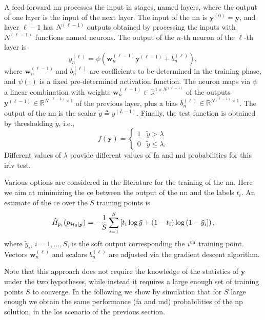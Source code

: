 \documentclass[conference]{IEEEtran}
\newcommand{\hatcross}{\hat{H}_{p_t}(p_{\mathcal{H}_0|\bf y})}
\begin{document}
A feed-forward \ac{nn} processes the input in stages, named layers, where the output of one layer is the input of the next layer. The input of the \ac{nn} is $\bm{y}^{(0)} = \bm{y}$, and layer $\ell-1$ has $N^{(\ell-1)}$ outputs obtained by processing the inputs with $N^{(\ell-1)}$ functions named neurons. The output of the $n$-th neuron of the $\ell$-th layer is
\begin{equation}\label{eq:nonLin}
y_n^{(\ell)} = \psi\left( \bm{w}_n^{(\ell -1)}\bm{y}^{(\ell-1)}+b_n^{(\ell)} \right),
\end{equation}
where $\bm{w}_n^{(\ell -1)}$ and $b_n^{(\ell)}$ are coefficients to be determined in the training phase, and $\psi(\cdot)$ is a fixed pre-determined activation function. The neuron maps via  $\psi$ a  linear combination with weights $\bm{w}_n^{(\ell -1)}\in \mathbb{R}^{1\times N^{(\ell-1)}}$ of the outputs $\bm{y}^{(\ell-1)} \in \mathbb{R}^{N^{(\ell-1)} \times 1 }$ of the previous layer, plus a bias $b_n^{(\ell)} \in \mathbb{R}^{N^{(\ell-1)} \times 1 }$. The output of the \ac{nn} is the scalar $\tilde{y} \triangleq y^{(L-1)}$. Finally, the test function is obtained by thresholding $\tilde{y}$, i.e.,
\begin{equation}
    f(\bm{y}) = \begin{cases}
    1 & \tilde{y} > \lambda \\
    0 & \tilde{y} \leq \lambda.
    \end{cases}
\end{equation}
Different values of $\lambda$ provide different values of \ac{fa} and \ac{md} probabilities for this \ac{irlv} test.

Various options are considered in the literature for the training of the \ac{nn}. Here we aim at minimizing the \ac{ce} between the output of the \ac{nn} and the labels $t_i$. An estimate of the \ac{ce} over the $S$ training points is 
\begin{equation}\label{eq:ce}
\hatcross = -\frac{1}{S} \sum_{i=1}^{S}\left[t_i\log \tilde{y} +\left(1-t_i\right)\log\left(1-\tilde{y}_i\right] \right),
\end{equation}
where $\tilde{y}_i$, $i=1, \ldots, S$, is the soft output corresponding the $i^{\rm th}$  training point. Vectors $\bm{w}_n^{(\ell)}$ and scalars $b_n^{(\ell)}$ are adjusted via the gradient descent algorithm. 

Note that this approach does not require the knowledge of the statistics of $\bm{y}$ under the two hypotheses, while instead it requires a large enough set of training points $S$ to converge. In the following we show by simulation that for $S$ large enough we obtain the same performance (\ac{fa} and \ac{md}) probabilities of the \ac{np} solution, in the \ac{los} scenario of the previous section.
\end{document}
